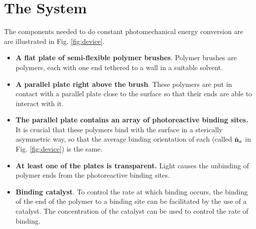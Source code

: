 \documentclass[11pt]{ucthesis}
\begin{document}
\section{The System}
\label{sec:System}
The components needed to do constant photomechanical energy conversion are
are illustrated in Fig.  \ref{fig:device}.
\begin{itemize}
\item {\bf A flat plate of semi-flexible polymer brushes}. Polymer brushes are
polymers, each with one end tethered to a wall in a suitable solvent.
\item  {\bf A parallel plate right above the brush}. 
These polymers are put in contact with a parallel
plate close to the surface so that their ends are able to interact with it.
\item {\bf The parallel plate contains an array of photoreactive binding
sites.} It is crucial that these
polymers bind with the surface in a sterically asymmetric way, 
so that the average binding orientation of each (called $\hat{\bf n}_a$ in Fig. \ref{fig:device}) is the same.
\item {\bf At least one of the plates is transparent.} Light 
causes the unbinding of polymer ends from the photoreactive binding sites. 
\item {\bf Binding catalyst}. To control the rate at which binding occurs, the
binding of the end of the polymer to a binding site can be facilitated by the
use of a catalyst. The concentration of the catalyst can be used to control the
rate of binding. 
\end{itemize}
\end{document}
